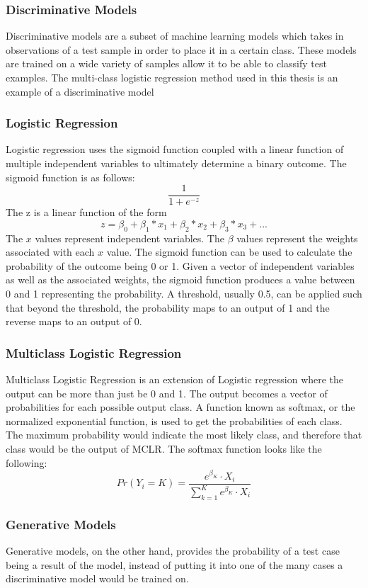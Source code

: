 \documentclass[12pt]{article}
\begin{document}
\subsubsection{Discriminative Models}
Discriminative models are a subset of machine learning models which takes in observations of a test sample in order to place it in a certain class.
These models are trained on a wide variety of samples allow it to be able to classify test examples. The multi-class logistic regression method used in this thesis is an example of a discriminative model

\subsubsection{Logistic Regression}
Logistic regression uses the sigmoid function coupled with a linear function of multiple independent variables to ultimately determine a binary outcome. The sigmoid function is as follows: 
\[\frac{1}{1+e^{-z}}\]
The z is a linear function of the form
\[z = \beta_0 + \beta_1*x_1 + \beta_2*x_2 + \beta_3*x_3  + ...\]
The \(x\) values represent independent variables. The \(\beta\) values represent the weights associated with each \(x\) value. The sigmoid function can be used to calculate the probability of the outcome being 0 or 1. Given a vector of independent variables as well as the associated weights, the sigmoid function produces a value between 0 and 1 representing the probability. A threshold, usually 0.5, can be applied such that beyond the threshold, the probability maps to an output of 1 and the reverse maps to an output of 0. 

\subsubsection{Multiclass Logistic Regression}
Multiclass Logistic Regression is an extension of Logistic regression where the output can be more than just be 0 and 1. The output becomes a vector of probabilities for each possible output class. A function known as softmax, or the normalized exponential function, is used to get the probabilities of each class. The maximum probability would indicate the most likely class, and therefore that class would be the output of MCLR. The softmax function looks like the following: 
\[Pr(Y_i = K) = \frac{e^{\beta_K} \cdot X_i}{\sum_{k=1}^{K} e^{\beta_K} \cdot X_i}\]

\subsubsection{Generative Models}
Generative models, on the other hand, provides the probability of a test case being a result of the model, instead of putting it into one of the many cases a discriminative model would be trained on. 
\end{document}
